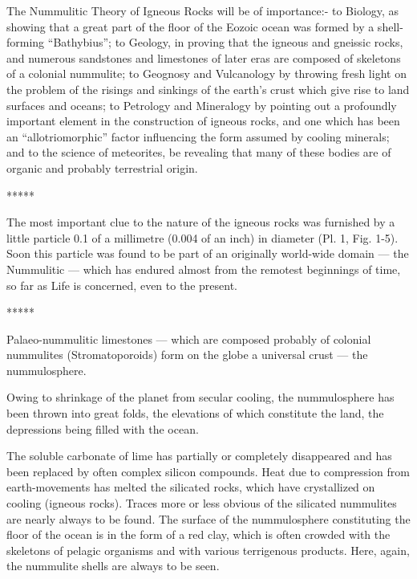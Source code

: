 \documentclass[a4paper, 12pt, oneside]{article}
\begin{document}
The Nummulitic Theory of Igneous Rocks will be of importance:- to Biology, as showing that a great part of the floor of the Eozoic ocean was formed by a shell-forming ``Bathybius''; to Geology, in proving that the igneous and gneissic rocks, and numerous sandstones and limestones of later eras are composed of skeletons of a colonial nummulite; to Geognosy and Vulcanology by throwing fresh light on the problem of the risings and sinkings of the earth's crust which give rise to land surfaces and oceans; to Petrology and Mineralogy by pointing out a profoundly important element in the construction of igneous rocks, and one which has been an ``allotriomorphic'' factor influencing the form assumed by cooling minerals; and to the science of meteorites, be revealing that many of these bodies are of organic and probably terrestrial origin.

\centerline{*\hspace{15mm}*\hspace{15mm}*\hspace{15mm}*\hspace{15mm}*}
\bigskip

The most important clue to the nature of the igneous rocks was furnished by a little particle 0.1 of a millimetre (0.004 of an inch) in diameter (Pl. 1, Fig. 1-5). Soon this particle was found to be part of an originally world-wide domain --- the Nummulitic --- which has endured almost from the remotest beginnings of time, so far as Life is concerned, even to the present.

\centerline{*\hspace{15mm}*\hspace{15mm}*\hspace{15mm}*\hspace{15mm}*}
\bigskip

Palaeo-nummulitic limestones --- which are composed probably of colonial nummulites (Stromatoporoids) form on the globe a universal crust --- the nummulosphere.

Owing to shrinkage of the planet from secular cooling, the nummulosphere has been thrown into great folds, the elevations of which constitute the land, the depressions being filled with the ocean.

The soluble carbonate of lime has partially or completely disappeared and has been replaced by often complex silicon compounds. Heat due to compression from earth-movements has melted the silicated rocks, which have crystallized on cooling (igneous rocks). Traces more or less obvious of the silicated nummulites are nearly always to be found. The surface of the nummulosphere constituting the floor of the ocean is in the form of a red clay, which is often crowded with the skeletons of pelagic organisms and with various terrigenous products. Here, again, the nummulite shells are always to be seen.
\end{document}

